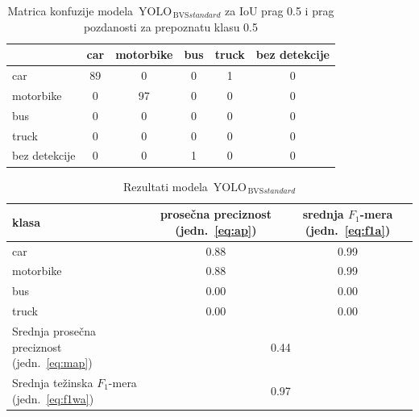 \documentclass[12pt,oneside]{memoir}
\newcommand{\yolo}{\ensuremath{\,\textrm{YOLO}}}
\newcommand{\bvs}{\ensuremath{\,\textrm{BVS}}}
\begin{document}
\begin{table}[htb]
    \begin{center}
    \caption{Matrica konfuzije modela $\yolo_{\bvs{standard}}$ za IoU prag 0.5 i prag pozdanosti za prepoznatu klasu 0.5 }
    \begin{tabular}{ l|c|c|c|c|c|}
                  & car  & motorbike & bus & truck & bez detekcije \\ \hline
    car           & 89   & 0         & 0   & 1     & 0             \\ 
    motorbike     & 0    & 97        & 0   & 0     & 0             \\ 
    bus           & 0    & 0         & 0   & 0     & 0             \\ 
    truck         & 0    & 0         & 0   & 0     & 0             \\ 
    bez detekcije & 0    & 0         & 1   & 0     & 0             \\ \hline
    \hline
    \end{tabular}
    \label{tab:YOLO4_BVSstandard_confusion_mat}
    \end{center}
\end{table}

\begin{table}[htb]
    \begin{center}
    \caption{Rezultati modela $\yolo_{\bvs{standard}}$}
        \begin{tabular}{|m{10em}|c|c|}
        \toprule
        klasa     & prosečna preciznost (jedn.~\ref{eq:ap}) & srednja $F_1$-mera (jedn.~\ref{eq:f1a})  \\ \hline
        \midrule
        car       & 0.88   & 0.99 \\ \hline
        motorbike & 0.88   & 0.99 \\ \hline
        bus       & 0.00   & 0.00 \\ \hline
        truck     & 0.00   & 0.00 \\ \hline
        \bottomrule
        Srednja prosečna preciznost (jedn.~\ref{eq:map}) & \multicolumn{2}{c|}{0.44}  \\ \hline
        Srednja težinska $F_1$-mera (jedn.~\ref{eq:f1wa}) & \multicolumn{2}{c|}{0.97}  \\ \hline
    \end{tabular}
    \label{tab:YOLO4_BVSstandard_results}
    \end{center}
\end{table}
\end{document}
